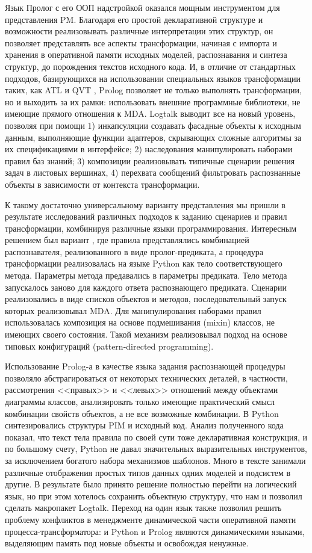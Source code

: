 \documentclass[12pt]{article}
\begin{document}
Язык Пролог с его ООП надстройкой оказался мощным инструментом для представления PM.  Благодаря его простой декларативной структуре и возможности реализовывать различные интерпретации этих структур, он позволяет представлять все аспекты трансформации, начиная с импорта и хранения в оперативной памяти исходных моделей, распознавания и синтеза структур, до порождения текстов исходного кода.  И, в отличие от стандартных подходов, базирующихся на использовании специальных языков трансформации таких, как ATL и QVT \cite{QVT}, Prolog позволяет не только выполнять трансформации, но и выходить за их рамки: использовать внешние программные библиотеки, не имеющие прямого отношения к MDA.  Logtalk выводит все на новый уровень, позволяя при помощи 1) инкапсуляции создавать фасадные объекты к исходным данным, выполняющие функции адаптеров, скрывающих сложные алгоритмы за их спецификациями в интерфейсе; 2) наследования манипулировать наборами правил баз знаний; 3) композиции реализовывать типичные сценарии решения задач в листовых вершинах, 4) перехвата сообщений фильтровать распознанные объекты в зависимости от контекста трансформации.

К такому достаточно универсальному варианту представления мы пришли в результате исследований различных подходов к заданию сценариев и правил трансформации, комбинируя различные языки программирования.  Интересным решением был вариант \cite{b2}, где правила представлялись комбинацией распознавателя, реализованного в виде пролог-предиката, а процедура трансформации реализовалась на языке Python как тело соответствующего метода.  Параметры метода предавались в параметры предиката.  Тело метода запускалось заново для каждого ответа распознающего предиката.  Сценарии реализовались в виде списков объектов и методов, последовательный запуск которых реализовывал MDA.  Для манипулирования наборами правил использовалась композиция на основе подмешивания (mixin) классов, не имеющих своего состояния.  Такой механизм реализовывал подход на основе типовых конфигураций (pattern-directed programming).

Использование Prolog-а в качестве языка задания распознающей процедуры позволяло абстрагироваться от некоторых технических деталей, в частности, рассмотрения <<правых>> и <<левых>> отношений между объектами диаграммы классов, анализировать только имеющие практический смысл комбинации свойств объектов, а не все возможные комбинации.  В Python синтезировались структуры PIM и исходный код.  Анализ полученного кода показал, что текст тела правила по своей сути тоже декларативная конструкция, и по большому счету, Python не давал значительных выразительных инструментов, за исключением богатого набора механизмов шаблонов.  Много в тексте занимали различные отображения простых типов данных одних моделей и подсистем в другие.  В результате было принято решение полностью перейти на логический язык, но при этом хотелось сохранить объектную структуру, что нам и позволил сделать макропакет Logtalk.  Переход на один язык также позволил решить проблему конфликтов в менеджменте динамической части оперативной памяти процесса-трансформатора: и Python и Prolog являются динамическими языками, выделяющим память под новые объекты и освобождая ненужные.
\end{document}
